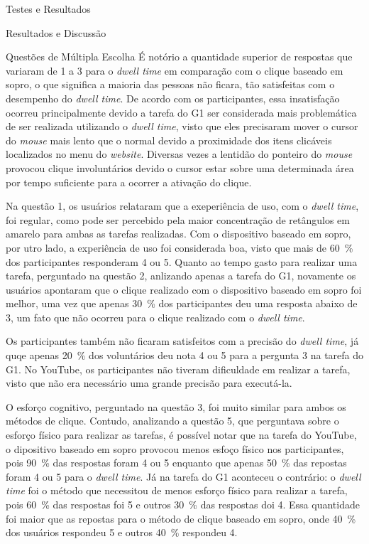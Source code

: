 \begin{chapter}{Testes e Resultados}
\begin{section}{Resultados e Discussão}
\begin{subsection}{Questões de Múltipla Escolha}
É notório a quantidade superior de respostas que variaram de 1 a 3 para o
\textit{dwell time} em comparação com o clique baseado em sopro, o  que
significa a maioria das pessoas não ficara, tão satisfeitas com o desempenho do
\textit{dwell time}. De acordo com os participantes, essa insatisfação ocorreu
principalmente devido a tarefa do G1 ser considerada mais problemática de ser
realizada utilizando o \textit{dwell time}, visto que eles precisaram mover o
cursor do \textit{mouse} mais lento que o normal devido a proximidade dos itens
clicáveis localizados no menu do \textit{website}. Diversas vezes a lentidão do
ponteiro do \textit{mouse} provocou clique involuntários devido o cursor estar
sobre uma determinada área por tempo suficiente para a ocorrer a ativação do 
clique.

Na questão 1, os usuários relataram que a exeperiência de uso, com o
\textit{dwell time}, foi regular, como pode ser percebido pela maior
concentração de retângulos em amarelo para ambas as tarefas realizadas. Com o
dispositivo baseado em sopro, por utro lado, a experiência de uso foi
considerada boa, visto que mais de 60~\% dos participantes responderam 4 ou 5.
Quanto ao tempo gasto para realizar uma tarefa, perguntado na questão 2,
anlizando apenas a tarefa do G1, novamente os usuários apontaram que o clique
realizado com o dispositivo baseado em sopro foi melhor, uma vez que apenas
30~\% dos participantes deu uma resposta abaixo de 3, um fato que não ocorreu
para o clique realizado com o \textit{dwell time}.

Os participantes também não ficaram satisfeitos com a precisão do \textit{dwell
time}, já quqe apenas 20~\% dos voluntários deu nota 4 ou 5 para a pergunta 3 na
tarefa do G1. No YouTube, os participantes não tiveram dificuldade em realizar a
tarefa, visto que não era necessário uma grande precisão para executá-la. 

O esforço cognitivo, perguntado na questão 3, foi muito similar para ambos os
métodos de clique. Contudo, analizando a questão 5, que perguntava sobre o
esforço físico para realizar as tarefas, é possível notar que na tarefa do
YouTube, o dipositivo baseado em sopro provocou menos esfoço físico nos
participantes, pois 90~\% das respostas foram 4 ou 5 enquanto que apenas 50~\%
das repostas foram 4 ou 5 para o \textit{dwell time}. Já na tarefa do G1
aconteceu o contrário: o \textit{dwell time} foi o método que necessitou de menos
esforço físico para realizar a tarefa, pois 60~\% das respostas foi 5 e outros
30~\% das respostas doi 4. Essa quantidade foi maior que as repostas para o
método de clique baseado em sopro, onde 40~\% dos usuários respondeu 5 e outros
40~\% respondeu 4.


\end{subsection}
\end{section}
\end{chapter}
